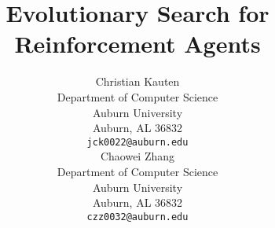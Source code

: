 \title{Evolutionary Search for Reinforcement Agents}

\author{
	Christian Kauten \\
	Department of Computer Science \\
	Auburn University \\
	Auburn, AL 36832 \\
	\texttt{jck0022@auburn.edu} \\
	\And
	Chaowei Zhang \\
	Department of Computer Science \\
	Auburn University \\
	Auburn, AL 36832 \\
	\texttt{czz0032@auburn.edu} \\
}

\maketitle
\clearpage
